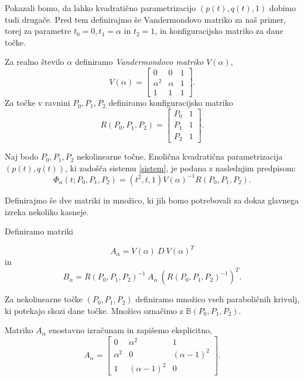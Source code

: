 \documentclass[mat1]{fmfdelo}
\newcommand{\B}{\mathbb B}
\newcommand{\al}{\alpha}
\begin{document}
Pokazali bomo, da lahko kvadratično parametrizacijo $(p(t), q(t),1)$ dobimo tudi drugače. Pred tem definirajmo še Vandermondovo matriko za naš primer, torej za parametre $t_0 = 0, t_1 = \al$ in $t_2 = 1$, in konfiguracijsko matriko za dane točke.

\begin{definicija}
Za realno število $\al$ definiramo \emph{Vandermondovo matriko} $V(\al)$,
$$V(\al) = 
\begin{bmatrix}
0 & 0 & 1 \\
\al ^2 & \al & 1 \\
1 & 1 & 1
\end{bmatrix}
.$$
Za točke v ravnini $P_0, P_1, P_2$ definiramo konfiguracijsko matriko
$$R(P_0, P_1, P_2) = 
\begin{bmatrix}
P_0 & 1 \\
P_1 & 1 \\
P_2 & 1
\end{bmatrix}
.$$
\end{definicija}


\begin{trditev}
Naj bodo $P_0, P_1, P_2$  nekolinearne točne. Enolična kvadratična parametrizacija $(p(t), q(t))$, ki zadošča sistemu \eqref{sistem}, je podana z naslednjim predpisom:
$$ \Phi_\al(t; P_0, P_1, P_2) = (t^2, t, 1) V(\al)^{-1} R(P_0, P_1, P_2).$$
\end{trditev}

Definirajmo še dve matriki in množico, ki jih bomo potrebovali za dokaz glavnega izreka nekoliko kasneje.

\begin{definicija}
Definiramo matriki

$$A_{\al} = V(\al) \ D \ V(\al)^T $$
in
$$B_{\al} =  R(P_0, P_1, P_2)^{-1}\  A_{\al} \  (R(P_0, P_1, P_2)^{-1})^T.$$

Za nekolinearne točke $(P_0, P_1, P_2)$ definiramo množico vseh paraboličnih krivulj, ki potekajo skozi dane točke. Množico označimo z $\B(P_0, P_1, P_2)$.

\end{definicija}

\begin{opomba}
Matriko $A_\al$ enostavno izračunam in zapišemo eksplicitno,
$$A_\al = 
\begin{bmatrix}
0 & \al^2 & 1 \\
\al^2 & 0 & (\al - 1)^2 \\
1 & (\al -1)^2 & 0
\end{bmatrix}
.$$

\end{opomba}
\end{document}
